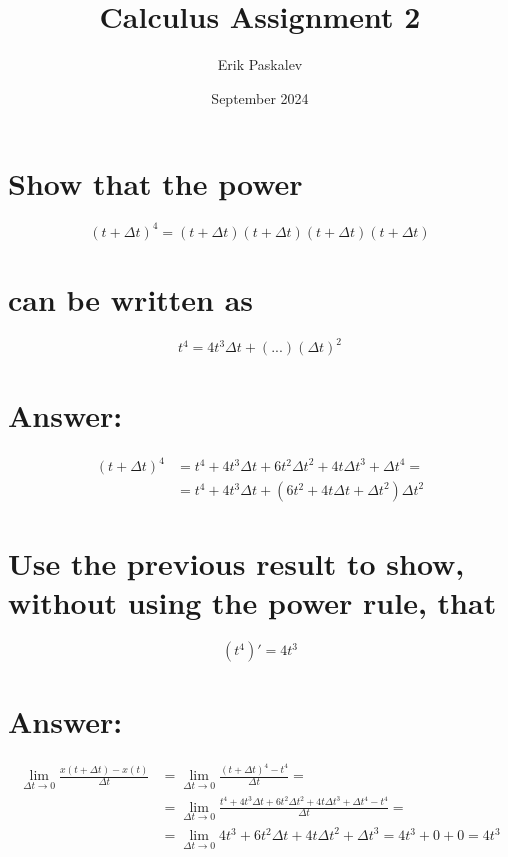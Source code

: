 \documentclass{article}
\title{Calculus Assignment 2}
\author{Erik Paskalev}
\date{September 2024}
\begin{document}
\maketitle

\section{\normalfont Show that the power }

\begin{equation}
(t + \Delta t)^4 = (t + \Delta t)(t + \Delta t)(t + \Delta t)(t + \Delta t)
\end{equation}

\section*{\normalfont can be written as}

\begin{equation}
t^4 = 4t^3\Delta t + (...)(\Delta t)^2
\end{equation}

\section*{Answer:}

\begin{equation}
\begin{split}
(t+\Delta t)^4 & = t^4 + 4t^3\Delta t + 6t^2{\Delta t}^2 + 4t{\Delta t}^3 + {\Delta t}^4 = \\ 
& =  t^4 + 4t^3\Delta t + (6t^2 + 4t\Delta t + {\Delta t}^2){\Delta t}^2
\end{split}
\end{equation}

\section{\normalfont Use the previous result to show, without using the power rule, that}

\begin{equation}
(t^4)' = 4t^3
\end{equation}

\section*{Answer:}

\begin{equation}
\begin{split}
\lim_{\Delta t \to 0} \frac{x(t+\Delta t)-x(t)}{\Delta t} & = \lim_{\Delta t \to 0} \frac{(t+\Delta t)^4 - t^4}{\Delta t} = \\ 
& = \lim_{\Delta t \to 0} \frac{t^4 + 4t^3\Delta t + 6t^2{\Delta t}^2 + 4t{\Delta t}^3 + {\Delta t}^4 - t^4}{\Delta t} = \\ 
& = \lim_{\Delta t \to 0} 4t^3 + 6t^2\Delta t + 4t{\Delta t}^2 + {\Delta t}^3 = 4t^3 + 0 + 0 = 4t^3
\end{split}
\end{equation}
\end{document}
